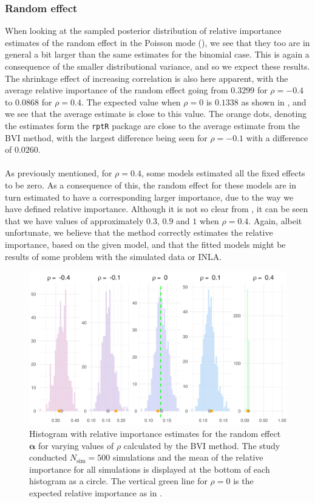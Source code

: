 \subsubsection{Random effect}
When looking at the sampled posterior distribution of relative importance estimates of the random effect in the Poisson mode (), we see that they too are in general a bit larger than the same estimates for the binomial case. This is again a consequence of the smaller distributional variance, and so we expect these results. The shrinkage effect of increasing correlation is also here apparent, with the average relative importance of the random effect going from $0.3299$ for $\rho=-0.4$ to $0.0868$ for $\rho=0.4$. The expected value when $\rho=0$ is $0.1338$ as shown in , and we see that the average estimate is close to this value. The orange dots, denoting the estimates form the \texttt{rptR} package are close to the average estimate from the BVI method, with the largest difference being seen for $\rho=-0.1$ with a difference of $0.0260$.
\\
\\
As previously mentioned, for $\rho=0.4$, some models estimated all the fixed effects to be zero. As a consequence of this, the random effect for these models are in turn estimated to have a corresponding larger importance,  due to the way we have defined relative importance. Although it is not so clear from , it can be seen that we have values of approximately $0.3$, $0.9$ and $1$ when $\rho=0.4$. Again, albeit unfortunate, we believe that the method correctly estimates the relative importance, based on the given model, and that the fitted models might be results of some problem with the simulated data or INLA.
\begin{figure}[H]
  \centering
    \includegraphics[width=1\linewidth]{Figures/Simulation study/Random_poisson.png}
    \caption{Histogram with relative importance estimates for the random effect $\boldsymbol{\alpha}$ for varying values of $\rho$ calculated by the BVI method. The study conducted $N_{\text{sim}}=500$ simulations and the mean of the relative importance for all simulations is displayed at the bottom of each histogram as a circle. The vertical green line for $\rho=0$ is the expected relative importance as in .}
    \label{fig:relimp_random_poisson}
\end{figure}
